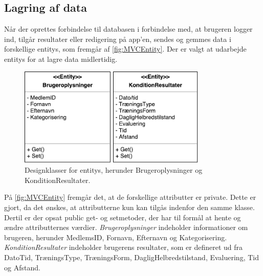 \subsection*{Lagring af data}  \label{sec:entity}
Når der oprettes forbindelse til databasen i forbindelse med, at brugeren logger ind, tilgår resultater eller redigering på app'en, sendes og gemmes data i forskellige entitys, som fremgår af \autoref{fig:MVCEntity}. Der er valgt at udarbejde entitys for at lagre data midlertidig.

\begin{figure} [H]
\centering
\includegraphics[width=0.8\textwidth]{figures/MVC/Entity}
\caption{Designklasser for entitys, herunder Brugeroplysninger og KonditionResultater.}
\label{fig:MVCEntity}
\end{figure}

\noindent
På \autoref{fig:MVCEntity} fremgår det, at de forskellige attributter er private. Dette er gjort, da det ønskes, at attributterne kun kan tilgås indenfor den samme klasse. Dertil er der opsat public get- og setmetoder, der har til formål at hente og ændre attributternes værdier. 
\textit{Brugeroplysninger} indeholder informationer om brugeren, herunder MedlemsID, Fornavn, Efternavn og Kategorisering. 
\textit{KonditionResultater} indeholder brugerens resultater, som er defineret ud fra DatoTid, TræningsType, TræningsForm, DagligHelbredstilstand, Evaluering, Tid og Afstand. 

